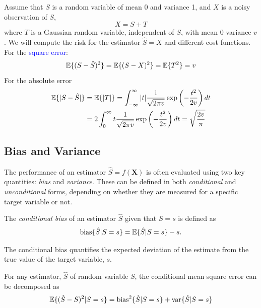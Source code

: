 \begin{example}
Assume that $S$ is a random variable of mean 0 and variance 1, and $X$ is a noisy observation of $S$,
\begin{equation}
X = S + T
\end{equation}
where $T$ is a Gaussian random variable, independent of $S$, with mean $0$ variance $v$. We will compute the risk for the estimator $\hat{S} = X$ and different cost functions. For the \textcolor{blue}{square error}:
\begin{equation}
\mathbb{E}\{(S-\hat{S})^2\} = \mathbb{E}\{(S-X)^2\} = \mathbb{E}\{T^2\} = v
\end{equation}
For the absolute error
\begin{align}
\mathbb{E}\{|S-\hat{S}|\}
    &= \mathbb{E}\{|T|\} 
     = \int_{-\infty}^{\infty} |t| \frac{1}{\sqrt{2\pi v}}\exp\left(-\frac{t^2}{2v}\right)dt 
\nonumber\\
    &= 2 \int_{0}^{\infty} t \frac{1}{\sqrt{2\pi v}}\exp\left(-\frac{t^2}{2v}\right)dt 
     = \sqrt{\frac{2v}{\pi}}
\end{align}
\end{example}


\subsection{Bias and Variance}
\label{subsec.bias_variance}

The performance of an estimator $\hat{S} = f(\mathbf{X})$ is often evaluated using two key quantities: \textit{bias} and \textit{variance}. These can be defined in both \textit{conditional} and \textit{unconditional} forms, depending on whether they are measured for a specific target variable or not.

\begin{definition}
The \textit{conditional bias} of an estimator $\hat{S}$ given that $S = s$ is defined as
\begin{align}
\text{bias}\{\hat{S} | S=s\} = \mathbb{E}\{\hat{S} | S=s\} - s.
\end{align}
\end{definition}

The conditional bias quantifies the expected deviation of the estimate from the true value of the target variable, $s$. 

\begin{theorem}
For any estimator, $\hat{S}$ of random variable $S$, the conditional mean square error can be decomposed as
\begin{align}
\mathbb{E}\{(\hat{S}-S)^2|S=s\} = {\rm bias}^2\{\hat{S} | S=s\} + {\rm var}\{\hat{S} | S=s\}
\label{eq:biasvar}
\end{align}
\end{theorem}


